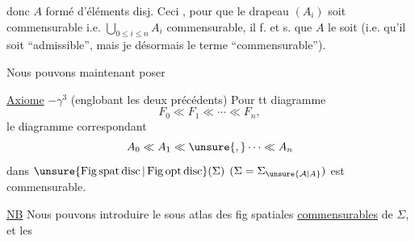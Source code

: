 
donc $A$ formé d'éléments  disj. Ceci , pour que le drapeau $(A_i)$ soit commensurable i.e. $\bigcup_{0\leq i\leq n}A_i$ commensurable, il f. et s. que $A$ le soit (i.e. qu'il soit ``admissible'', mais je  désormais le terme ``commensurable'').

Nous pouvons maintenant poser

\uline{Axiome} \uline{ $-\gamma^3$} (englobant les deux précédents) Pour tt diagramme
\[
F_0\ll F_1\ll\cdots\ll F_n,
\]
le diagramme correspondant
\[
A_0\ll A_1\ll\unsure{,}\cdots\ll A_n
\]
dans $\unsure{\operatorname{Fig\,spat\,disc}|\operatorname{Fig\,opt\,disc}}(\Sigma)$ $(\Sigma=\Sigma_{\unsure{\mathcal A|A}})$ est commensurable.

\uline{NB} Nous pouvons introduire  le sous atlas  des fig  spatiales \uline{commensurables} de $\Sigma$, et  les  
